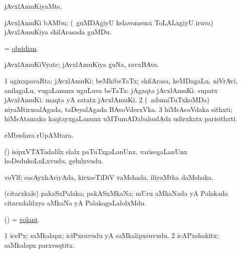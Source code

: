 \bentry 
{} 
\gl{\kirxvi}
\expl{}
\bmng
 jAvxlAmuKiyaMte. 
\emng
\eentry

\bentry 
{}
\gl{\nA}
\expl{}
\bmng
 jAvxlAmuKi bAMbu; (\sA\ guMDAgiyU kelavomemx ToLALxgiyU iruva) jAvxlAmuKiya shilArasada guMDu. 
\emng
\eentry

\bentry 
{} 
\gl{\nA}
\expl{}
\bmng
 = \hyperref{kandict_o.pdf}{O}{obsidian}{obsidian}. 
\emng
\eentry

\bentry
{} 
\gl{\nA}
\expl{}
\bmng
 jAvxlAmuKiVyate; jAvxlAmuKiya guNa, savxBAva. 
\emng
\eentry

\bentry 
{} 
\gl{\nA}
\bmng
\bnum
\num{1} aginxpavaRta; jAvxlAmuKi; beMkibeTaTx; shilArasa, keMDagaLu, niVrAvi, anilagaLu, \mo vugaLanunx uguLuva beTaTx:  jAgaqta jAvxlAmuKi.  supatx jAvxlAmuKi.  maqta yA satatx jAvxlAmuKi. 
\num{2} (\kanmu\ adumiTuTxkoMDa) niyaMtirxsalAgada, taDeyalAgada BAvoVderxVka. 
\num{3} hiMsAcoVdaka sithxti; hiMsAtamxka kaqtayxgaLanunx uMTumADabahudAda udirxkatx parisithxti. 
\enum
\emng
\eentry

\bentry
{} 
\gl{\nA}
\expl{}
\bmng
  eMbudara rUpAMtara. 
\emng
\eentry

\bentry 
{} 
\gl{\nA}
\expl{}
\bmng
 (\pArxparx) isipxVTATadalilx elalx paTuTxgaLanUnx, varisegaLanUnx hoDedukoLuLxvudu, gelulxvudu. 
\emng
\eentry

\bentry 
{} 
\gl{\nA}
\expl{}
\bmng
 voVlf; sasAyxhAriyAda, kirxseTiDiV vaMshada, iliyaMtha daMshaka.  
\emng
\eentry

\bentry
{} 
\gl{\nA}
\expl{}
\bmng
 (citarxkale) pakaSxPalaka; pakASxMkaNa; mUru aMkaNada yA Palakada citarxdalilxya aMkaNa yA PalakagaLalolxMdu. 
\emng
\eentry

\bentry 
{} 
\gl{\gu}
\expl{}
\bmng
 (\pArxvi) = \hyperlink{volant}{volant}. 
\emng
\eentry

\bentry
{} 
\gl{\nA}
\expl{}
\bmng
\bnum
\num{1} icePx; saMkalapx; iciPxsuvudu yA saMkalipxsuvudu. 
\num{2} icAPxshakitx; saMkalapx parxvaqtitx. 
\enum
\emng

